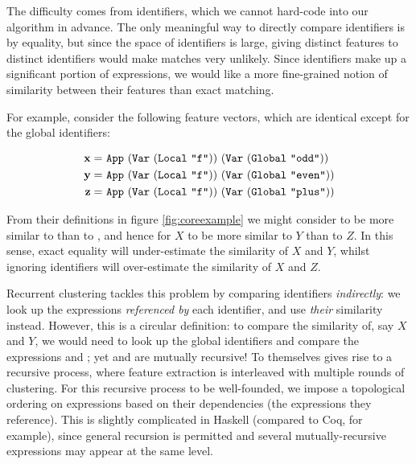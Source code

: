 The difficulty comes from identifiers, which we cannot hard-code into our algorithm in advance. The only meaningful way to directly compare identifiers is by equality, but since the space of identifiers is large, giving distinct features to distinct identifiers would make matches very unlikely. Since identifiers make up a significant portion of expressions, we would like a more fine-grained notion of similarity between their features than exact matching.

For example, consider the following feature vectors, which are identical except for the global identifiers:

\begin{equation*}
  \begin{split}
    \vect{x} =\ & \texttt{App}\ (\texttt{Var}\ (\texttt{Local}\ \texttt{"f"}))\ (\texttt{Var}\ (\texttt{Global}\ \texttt{"odd"})) \\
    \vect{y} =\ & \texttt{App}\ (\texttt{Var}\ (\texttt{Local}\ \texttt{"f"}))\ (\texttt{Var}\ (\texttt{Global}\ \texttt{"even"})) \\
    \vect{z} =\ & \texttt{App}\ (\texttt{Var}\ (\texttt{Local}\ \texttt{"f"}))\ (\texttt{Var}\ (\texttt{Global}\ \texttt{"plus"}))
  \end{split}
\end{equation*}

From their definitions in figure \ref{fig:coreexample} we might consider  to be more similar to  than to , and hence for $X$ to be more similar to $Y$ than to $Z$. In this sense, exact equality will under-estimate the similarity of $X$ and $Y$, whilst ignoring identifiers will over-estimate the similarity of $X$ and $Z$.

Recurrent clustering tackles this problem by comparing identifiers \emph{indirectly}: we look up the expressions \emph{referenced by} each identifier, and use \emph{their} similarity instead. However, this is a circular definition: to compare the similarity of, say $X$ and $Y$, we would need to look up the global identifiers and compare the expressions  and ; yet  and  are mutually recursive! To  themselves gives rise to a recursive process, where feature extraction is interleaved with multiple rounds of clustering. For this recursive process to be well-founded, we impose a topological ordering on expressions based on their dependencies (the expressions they reference). This is slightly complicated in Haskell (compared to Coq, for example), since general recursion is permitted and several mutually-recursive expressions may appear at the same level.

